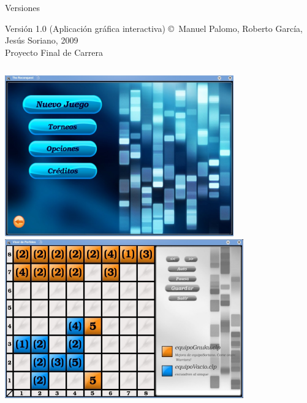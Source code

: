 \documentclass[smaller,spanish,xcolor=svgnames]{beamer}
\begin{document}
\begin{frame}{Versiones}
  \begin{block}{Versión 1.0 (Aplicación gráfica interactiva)}
      \copyright \, Manuel Palomo, Roberto García, Jesús Soriano, 2009\\
      Proyecto Final de Carrera    
  \end{block}

  \begin{columns}[c]
    \includegraphics[width=\textwidth]{img/version_31}
    \includegraphics[width=\textwidth]{img/version_32}    
  \end{columns}  
\end{frame}
\end{document}
